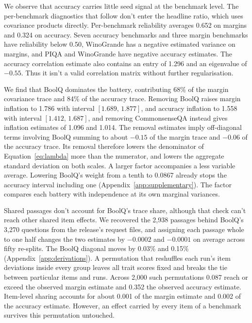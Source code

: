 \documentclass{article}
\newcommand{\ci}[2]{\ensuremath{[#1,\,#2]}}
\begin{document}
We observe that accuracy carries little seed signal at the benchmark level. The per-benchmark diagnostics that follow don't enter the headline ratio, which uses covariance products directly. Per-benchmark reliability averages 0.652 on margins and 0.324 on accuracy. Seven accuracy benchmarks and three margin benchmarks have reliability below 0.50, WinoGrande has a negative estimated variance on margins, and PIQA and WinoGrande have negative accuracy estimates. The accuracy correlation estimate also contains an entry of 1.296 and an eigenvalue of $-0.55$. Thus it isn't a valid correlation matrix without further regularisation.

We find that BoolQ dominates the battery, contributing 68\% of the margin covariance trace and 84\% of the accuracy trace. Removing BoolQ raises margin inflation to 1.786 with interval \ci{1.689}{1.877}, and accuracy inflation to 1.558 with interval \ci{1.412}{1.687}, and removing CommonsenseQA instead gives inflation estimates of 1.096 and 1.014. The removal estimates imply off-diagonal terms involving BoolQ summing to about $-0.15$ of the margin trace and $-0.06$ of the accuracy trace. Its removal therefore lowers the denominator of Equation~\ref{eq:lambda} more than the numerator, and lowers the aggregate standard deviation on both scales. A larger factor accompanies a less variable average. Lowering BoolQ's weight from a tenth to 0.0867 already stops the accuracy interval including one (Appendix~\ref{app:supplementary}). The factor compares each battery with independence at its own marginal variances.

Shared passages don't account for BoolQ's trace share, although that check can't reach other shared item effects. We recovered the 2,938 passages behind BoolQ's 3,270 questions from the release's request files, and assigning each passage whole to one half changes the two estimates by $-0.0002$ and $-0.0001$ on average across fifty re-splits. The BoolQ diagonal moves by 0.03\% and 0.15\% (Appendix~\ref{app:derivations}). A permutation that reshuffles each run's item deviations inside every group leaves all trait scores fixed and breaks the tie between particular items and runs. Across 2,000 such permutations 0.087 reach or exceed the observed margin estimate and 0.352 the observed accuracy estimate. Item-level sharing accounts for about 0.001 of the margin estimate and 0.002 of the accuracy estimate. However, an effect carried by every item of a benchmark survives this permutation untouched.
\end{document}
